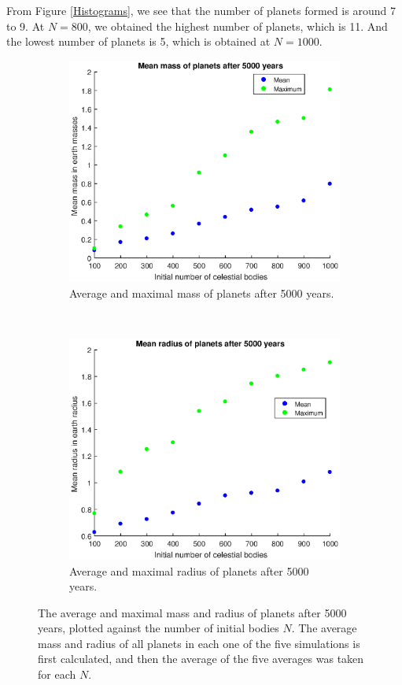 From Figure \ref{Histograms}, we see that the number of planets formed is around 7 to 9. At $N=800$, we obtained the highest number of planets, which is 11. And the lowest number of planets is 5, which is obtained at $N=1000$.
\vspace{-10pt}
\begin{figure}[H]
	\centering
	\begin{subfigure}{0.45\textwidth}
	\includegraphics[width=\textwidth]{Eindmassa.eps}
	\caption{Average and maximal mass of planets after 5000 years.}
	\end{subfigure}
	~
	\begin{subfigure}{0.45\textwidth}
	\includegraphics[width=\textwidth]{Eindstraal.eps}
	\caption{Average and maximal radius of planets after 5000 years.}
	\end{subfigure}
	\caption{The average and maximal mass and radius of planets after 5000 years, plotted against the number of initial bodies $N$. The average mass and radius of all planets in each one of the five simulations is first calculated, and then the average of the five averages was taken for each $N$.}
	\label{AverageMassandRadius}
\end{figure} 
